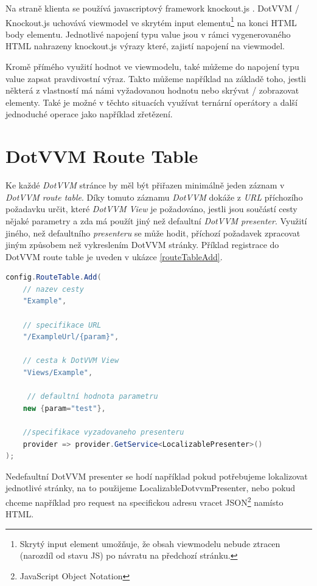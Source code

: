 Na straně klienta se používá javascriptový framework knockout.js . DotVVM / Knockout.js uchovává viewmodel ve skrytém input elementu\footnote{Skrytý input element umožňuje, že obsah viewmodelu nebude ztracen (narozdíl od stavu JS) po návratu na předchozí stránku.} na konci HTML body elementu. Jednotlivé napojení typu value jsou v rámci vygenerovaného HTML nahrazeny knockout.js výrazy které, zajistí napojení na viewmodel.

Kromě přímého využití hodnot ve viewmodelu, také můžeme do napojení typu value zapsat pravdivostní výraz. Takto můžeme například na základě toho, jestli některá z vlastností má námi vyžadovanou hodnotu nebo skrývat / zobrazovat elementy. Také je možné v těchto situacích využívat ternární operátory a další jednoduché operace jako například zřetězení. 
\section{DotVVM Route Table}
Ke každé \emph{DotVVM} stránce by měl být přiřazen minimálně jeden záznam v \emph{DotVVM route table}\cite{DotVVM-Routing}. Díky tomuto záznamu \emph{DotVVM} dokáže z \emph{URL} příchozího požadavku určit, které \emph{DotVVM View} je požadováno, jestli jsou součástí cesty nějaké parametry a zda má použít jiný než defaultní \emph{DotVVM presenter}. Využití jiného, než defaultního \emph{presenteru} se může hodit, příchozí požadavek zpracovat jiným způsobem než vykreslením DotVVM stránky. Příklad registrace do DotVVM route table je uveden v ukázce \ref{routeTableAdd}.
\begin{lstlisting}[language=C#, caption=Ukázka přidání záznamu do DotVVM route table v rámci \emph{DotvvmStartup.cs}.,label=routeTableAdd,captionpos=t]
config.RouteTable.Add(
    // nazev cesty
    "Example",
    
    // specifikace URL
    "/ExampleUrl/{param}",
    
    // cesta k DotVVM View
    "Views/Example", 
    
     // defaultní hodnota parametru
    new {param="test"},
    
    //specifikace vyzadovaneho presenteru
    provider => provider.GetService<LocalizablePresenter>()
);
\end{lstlisting}

Nedefaultní DotVVM presenter se hodí například pokud potřebujeme lokalizovat jednotlivé stránky, na to použijeme LocalizableDotvvmPresenter, nebo pokud chceme například pro request na specifickou adresu vracet JSON\footnote{JavaScript Object Notation} namísto HTML.
